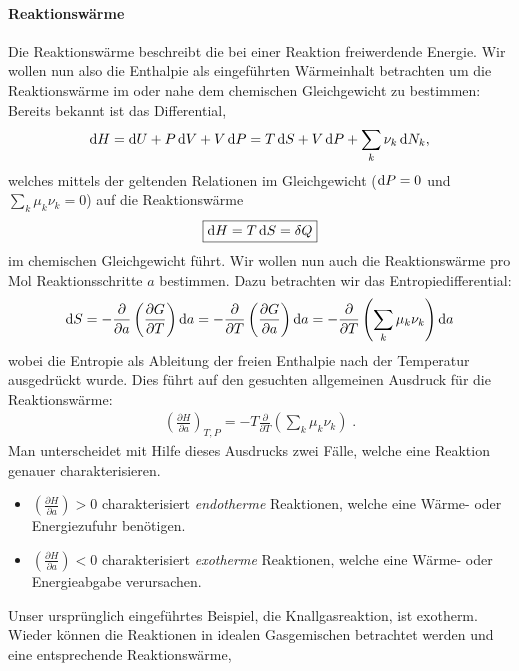 \paragraph*{Reaktionswärme}
Die Reaktionswärme beschreibt die bei einer Reaktion freiwerdende Energie.
Wir wollen nun also die Enthalpie als eingeführten Wärmeinhalt betrachten um die Reaktionswärme im oder nahe dem chemischen Gleichgewicht zu bestimmen: Bereits bekannt ist das Differential,
\begin{align*}
    \mathop{}\!\mathrm{d} H=\mathop{}\!\mathrm{d} U + P\mathop{}\!\mathrm{d} V +V \mathop{}\!\mathrm{d} P= T\mathop{}\!\mathrm{d} S+V\mathop{}\!\mathrm{d} P+\sum_{k}\nu_k\mathop{}\!\mathrm{d} N_k,
\end{align*}
welches mittels der geltenden Relationen im Gleichgewicht ($\mathop{}\!\mathrm{d} P=0$ und $\sum_{k}\mu_k\nu_k=0$) auf die Reaktionswärme
\begin{align*}
    \boxed{\mathop{}\!\mathrm{d} H=T\mathop{}\!\mathrm{d} S=\mathop{}\!\delta Q}
\end{align*}
im chemischen Gleichgewicht führt.
Wir wollen nun auch die Reaktionswärme pro Mol Reaktionsschritte $a$ bestimmen. Dazu betrachten wir das Entropiedifferential:
\begin{align*}
    \mathop{}\!\mathrm{d} S=-\frac{\partial}{\partial a}\left(\frac{\partial G}{\partial T}\right)\mathop{}\!\mathrm{d} a=-\frac{\partial}{\partial T}\left(\frac{\partial G}{\partial a}\right)\mathop{}\!\mathrm{d} a=-\frac{\partial}{\partial T}\left(\sum_{k}\mu_k\nu_k\right)\mathop{}\!\mathrm{d} a
\end{align*}
wobei die Entropie als Ableitung der freien Enthalpie nach der Temperatur ausgedrückt wurde.
Dies führt auf den gesuchten allgemeinen Ausdruck für die Reaktionswärme:
\begin{align*}
    \boxed{\left(\frac{\partial H}{\partial a}\right)_{T,P}=-T\frac{\partial}{\partial T}\left(\sum_{k}\mu_k\nu_k\right)}\;.
\end{align*}
Man unterscheidet mit Hilfe dieses Ausdrucks zwei Fälle, welche eine Reaktion genauer charakterisieren.
\begin{itemize}
    \item $\left(\frac{\partial H}{\partial a}\right)>0$ charakterisiert \emph{endotherme} Reaktionen, welche eine Wärme- oder Energiezufuhr benötigen.
    \item $\left(\frac{\partial H}{\partial a}\right)<0$ charakterisiert \emph{exotherme} Reaktionen, welche eine Wärme- oder Energieabgabe verursachen.
\end{itemize}
Unser ursprünglich eingeführtes Beispiel, die Knallgasreaktion, ist exotherm.
Wieder können die Reaktionen in idealen Gasgemischen betrachtet werden und eine entsprechende Reaktionswärme, 
